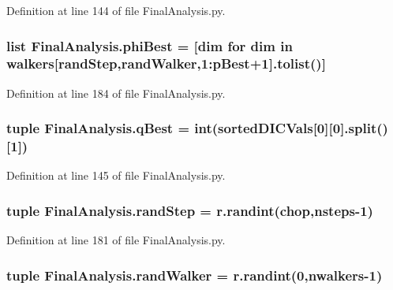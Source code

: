 Definition at line 144 of file Final\-Analysis.\-py.

\hypertarget{namespace_final_analysis_a8d45e2b4a2cbacf49eab526ac11ecc77}{
\subsubsection[{phi\-Best}]{\setlength{\rightskip}{0pt plus 5cm}list Final\-Analysis.\-phi\-Best = \mbox{[}dim for dim in {\bf walkers}\mbox{[}{\bf rand\-Step},{\bf rand\-Walker},1\-:{\bf p\-Best}+1\mbox{]}.tolist()\mbox{]}}}\label{namespace_final_analysis_a8d45e2b4a2cbacf49eab526ac11ecc77}


Definition at line 184 of file Final\-Analysis.\-py.

\hypertarget{namespace_final_analysis_a52c1bec46dd832ef73e9e1d21d28155b}{
\subsubsection[{q\-Best}]{\setlength{\rightskip}{0pt plus 5cm}tuple Final\-Analysis.\-q\-Best = int({\bf sorted\-D\-I\-C\-Vals}\mbox{[}0\mbox{]}\mbox{[}0\mbox{]}.split()\mbox{[}1\mbox{]})}}\label{namespace_final_analysis_a52c1bec46dd832ef73e9e1d21d28155b}


Definition at line 145 of file Final\-Analysis.\-py.

\hypertarget{namespace_final_analysis_a02480d595c49c0f2494cb9b94dc93ad8}{
\subsubsection[{rand\-Step}]{\setlength{\rightskip}{0pt plus 5cm}tuple Final\-Analysis.\-rand\-Step = r.\-randint(chop,{\bf nsteps}-\/1)}}\label{namespace_final_analysis_a02480d595c49c0f2494cb9b94dc93ad8}


Definition at line 181 of file Final\-Analysis.\-py.

\hypertarget{namespace_final_analysis_a9dab2cf8612b12f65a094eac2c433ac1}{
\subsubsection[{rand\-Walker}]{\setlength{\rightskip}{0pt plus 5cm}tuple Final\-Analysis.\-rand\-Walker = r.\-randint(0,{\bf nwalkers}-\/1)}}\label{namespace_final_analysis_a9dab2cf8612b12f65a094eac2c433ac1}


